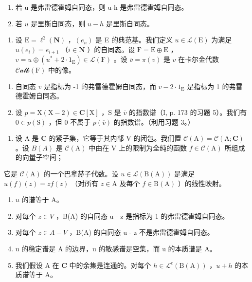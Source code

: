 \begin{enumerate}
\def\labelenumi{\alph{enumi})}
\item
  若 u 是弗雷德霍姆自同态，则 u-h 是弗雷德霍姆自同态。
\item
  若 \(u\) 是里斯自同态，则 \(u - h\) 是里斯自同态。
\end{enumerate}

\begin{enumerate}
\def\labelenumi{\arabic{enumi})}
\setcounter{enumi}{10}
\tightlist
\item
  设 \(\mathrm{E} = \ell^2 (\mathbf{N})\) ，\((e_n)\) 是 E 的典范基。我们定义 \(u\in \mathcal{L}(\mathrm{E})\) 为满足 \(u(e_i) = e_{i + 1}\) （\(i\in \mathbf{N}\) ）的自同态。设 \(\mathrm{F} = \mathrm{E}\oplus \mathrm{E}\) ，\(v = u\oplus (u^{*} + 2\cdot 1_{\mathrm{E}})\in \mathcal{L}(\mathrm{F})\) 。设 \(\overline{v} = \pi (v)\) 是 \(v\) 在卡尔金代数 \(\mathcal{Calk}(\mathrm{F})\) 中的像。
\end{enumerate}

\begin{enumerate}
\def\labelenumi{\alph{enumi})}
\item
  自同态 \(v\) 是指标为 -1 的弗雷德霍姆自同态，而 \(v - 2 \cdot 1_{\mathrm{E}}\) 是指标为 1 的弗雷德霍姆自同态。
\item
  设 \(p = \mathrm{X}(\mathrm{X} - 2) \in \mathbf{C}[\mathrm{X}]\) ，S 是 \(\overline{v}\) 的指数谱（I, p. 173 的习题 5）。我们有 \(0 \in p(\mathrm{S})\) ，但 0 不属于 \(p(\overline{v})\) 的指数谱。（利用习题 3。）
\end{enumerate}

\exercisesection{}

\begin{enumerate}
\def\labelenumi{\arabic{enumi})}
\tightlist
\item
  设 A 是 \(\mathbf{C}\) 的紧子集，它等于其内部 V 的闭包。我们置 \(\mathcal{C}(\mathrm{A}) = \mathcal{C}(\mathrm{A};\mathbf{C})\) 。设 \(B(A)\) 是 \(\mathcal{C}(\mathrm{A})\) 中由在 V 上的限制为全纯的函数 \(f\in \mathcal{C}(\mathrm{A})\) 所组成的向量子空间；
\end{enumerate}

它是 \(\mathcal{C}(\mathrm{A})\) 的一个巴拿赫子代数。设 \(u \in \mathcal{L}(\mathrm{B}(\mathrm{A}))\) 是满足 \(u(f)(z) = zf(z)\) （对所有 \(z \in \mathrm{A}\) 及每个 \(f \in \mathrm{B}(\mathrm{A})\) ）的线性映射。

\begin{enumerate}
\def\labelenumi{\alph{enumi})}
\item
  \(u\) 的谱等于 A。
\item
  对每个 \(z \in V\) ，B(A) 的自同态 u - z 是指标为 1 的弗雷德霍姆自同态。
\item
  对每个 \(z \in A - V\) ，B(A) 的自同态 u - z 不是弗雷德霍姆自同态。
\item
  u 的稳定谱是 A 的边界，u 的敏感谱是空集，而 u 的本质谱是 A。
\item
  我们假设 A 在 \(\mathbf{C}\) 中的余集是连通的。对每个 \(h \in \mathcal{L}^{c}(\mathrm{B}(\mathrm{A}))\) ，\(u + h\) 的本质谱等于 A。
\end{enumerate}

